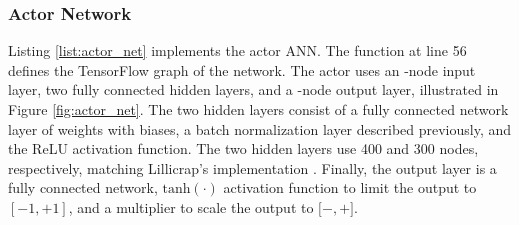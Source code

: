 \subsubsection{Actor Network}
Listing \ref{list:actor_net} implements the actor ANN. The function  at line 56 defines the TensorFlow graph of the network. The actor uses an -node input layer, two fully connected hidden layers, and a  -node output layer, illustrated in Figure \ref{fig:actor_net}. The two hidden layers consist of a fully connected network layer of weights with biases, a batch normalization layer described previously, and the ReLU activation function. The two hidden layers use 400 and 300 nodes, respectively, matching Lillicrap's implementation \cite{lillicrap_2016}. Finally, the output layer is a fully connected network, $\text{tanh}(\cdot)$ activation function to limit the output to $[-1,+1]$, and a multiplier to scale the output to $[-$$,+$$]$.

